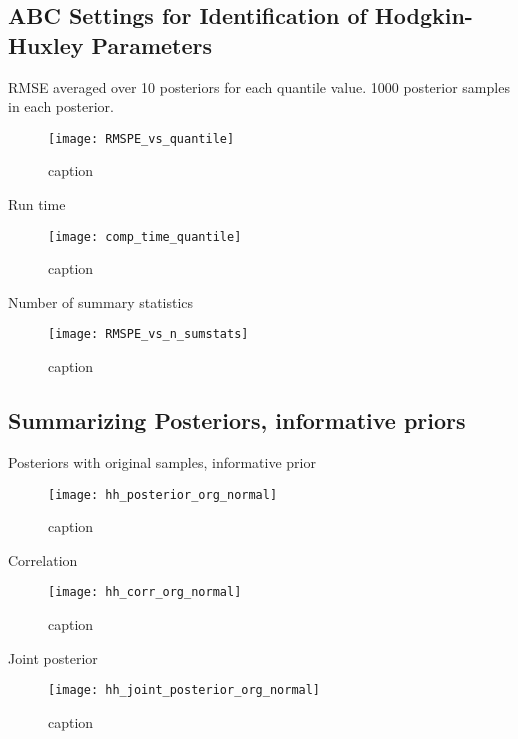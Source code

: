 \subsection{ABC Settings for Identification of Hodgkin-Huxley Parameters}

RMSE averaged over 10 posteriors for each quantile value. 1000 posterior samples in each posterior. 

\begin{figure}[H]
    \centering
    \texttt{[image: RMSPE\_vs\_quantile]}
    \caption{caption}
    \label{fig:fig1}
\end{figure} 

Run time

\begin{figure}[H]
    \centering
    \texttt{[image: comp\_time\_quantile]}
    \caption{caption}
    \label{fig:fig1}
\end{figure}


Number of summary statistics

\begin{figure}[H]
    \centering
    \texttt{[image: RMSPE\_vs\_n\_sumstats]}
    \caption{caption}
    \label{fig:fig1}
\end{figure} 


\subsection{Summarizing Posteriors, informative priors}

Posteriors with original samples, informative prior

\begin{figure}[H]
    \centering
    \texttt{[image: hh\_posterior\_org\_normal]}
    \caption{caption}
    \label{fig:fig1}
\end{figure}

Correlation

\begin{figure}[H]
    \centering
    \texttt{[image: hh\_corr\_org\_normal]}
    \caption{caption}
    \label{fig:fig1}
\end{figure}

Joint posterior 

\begin{figure}[H]
    \centering
    \texttt{[image: hh\_joint\_posterior\_org\_normal]}
    \caption{caption}
    \label{fig:fig1}
\end{figure}

